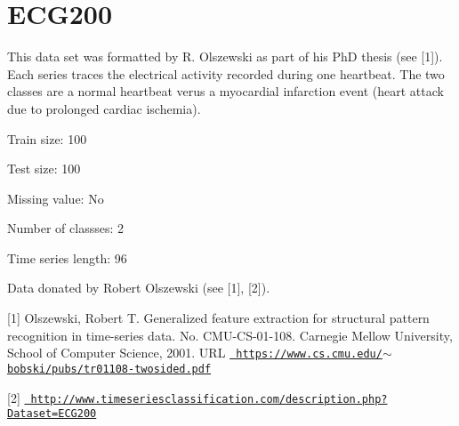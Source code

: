 \chapter{ECG200}
\hypertarget{md_external_2data_2UCRArchive__2018_2ECG200_2README}{}\label{md_external_2data_2UCRArchive__2018_2ECG200_2README}
\label{md_external_2data_2UCRArchive__2018_2ECG200_2README_autotoc_md58}%
%
 This data set was formatted by R. Olszewski as part of his PhD thesis (see \mbox{[}1\mbox{]}). Each series traces the electrical activity recorded during one heartbeat. The two classes are a normal heartbeat verus a myocardial infarction event (heart attack due to prolonged cardiac ischemia).

Train size\+: 100

Test size\+: 100

Missing value\+: No

Number of classses\+: 2

Time series length\+: 96

Data donated by Robert Olszewski (see \mbox{[}1\mbox{]}, \mbox{[}2\mbox{]}).

\mbox{[}1\mbox{]} Olszewski, Robert T. Generalized feature extraction for structural pattern recognition in time-\/series data. No. CMU-\/\+CS-\/01-\/108. Carnegie Mellow University, School of Computer Science, 2001. URL \href{https://www.cs.cmu.edu/~bobski/pubs/tr01108-twosided.pdf}{\texttt{ https\+://www.\+cs.\+cmu.\+edu/\texorpdfstring{$\sim$}{\string~}bobski/pubs/tr01108-\/twosided.\+pdf}}

\mbox{[}2\mbox{]} \href{http://www.timeseriesclassification.com/description.php?Dataset=ECG200}{\texttt{ http\+://www.\+timeseriesclassification.\+com/description.\+php?\+Dataset=\+ECG200}} 